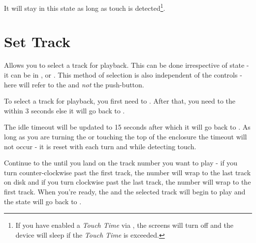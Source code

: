 It will stay in this state as long as touch is detected\footnote{ If you have
enabled a \textit{Touch Time} via \hyperref[Power Settings]{}, the screens
will turn off and the device will sleep if the \textit{Touch Time} is exceeded.}.

\section{Set Track} \label{Set Track} 

Allows you to select a track for playback. This can be done
irrespective of  state - it can be in ,  or
.  This method of selection is also independent of the 
controls -  here will refer to the  and \textit{not} the
 push-button.

\par\medskip

To select a track for playback, you first need to . After that, you
need to  the  within \num{3} seconds else it will go back to
.


The idle timeout will be updated to \num{15} seconds after which it will go back
to . As long as you are turning the  or touching the top of the
enclosure the timeout will not occur - it is reset with each turn and while
detecting touch.


Continue to  the  until you land on the track number you want
to play - if you turn counter-clockwise past the first track, the number will
wrap to the last track on disk and if you turn clockwise past the last track,
the number will wrap to the first track.  When you're ready,  the
 and the selected track will begin to play and the state will go back to
.


